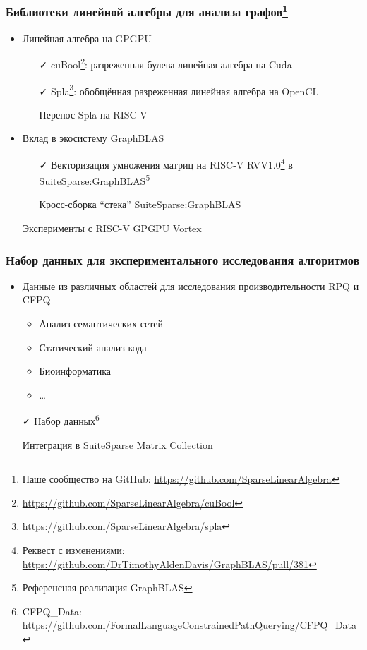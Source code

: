\documentclass[xcolor=table,aspectratio=169]{beamer}
\begin{document}
\begin{frame}[fragile]
  \frametitle{Библиотеки линейной алгебры для анализа графов\footnote{Наше сообщество на GitHub: \url{https://github.com/SparseLinearAlgebra}}}
  \begin{itemize}
    \item Линейная алгебра на GPGPU
    \begin{itemize}
      \item[\faCheck] cuBool\footnote{\url{https://github.com/SparseLinearAlgebra/cuBool}}: разреженная булева линейная алгебра на Cuda
      \item[\faCheck] Spla\footnote{\url{https://github.com/SparseLinearAlgebra/spla}}: обобщённая разреженная линейная алгебра на OpenCL
      \item[\faGears] Перенос Spla на RISC-V
    \end{itemize}
    \item Вклад в экосистему GraphBLAS
    \begin{itemize}
      \item[\faCheck] Векторизация умножения матриц на RISC-V RVV1.0\footnote{Реквест с изменениями: \url{https://github.com/DrTimothyAldenDavis/GraphBLAS/pull/381}} в SuiteSparse:GraphBLAS\footnote{Референсная реализация GraphBLAS}
      \item[\faGears] Кросс-сборка ``стека'' SuiteSparse:GraphBLAS
    \end{itemize}
    \item[\faGears] Эксперименты с RISC-V GPGPU Vortex
  \end{itemize}
\end{frame}

\begin{frame}[fragile]
  \frametitle{Набор данных для экспериментального исследования алгоритмов}
  \begin{itemize}
    \item Данные из различных областей для исследования производительности RPQ и CFPQ
    \begin{itemize}
      \item Анализ семантических сетей
      \item Статический анализ кода
      \item Биоинформатика
      \item \ldots
    \end{itemize}    
    \item[\faCheck] Набор данных\footnote{CFPQ\_Data: \url{https://github.com/FormalLanguageConstrainedPathQuerying/CFPQ_Data}}
    \item[\faGears] Интеграция в SuiteSparse Matrix  Collection 
  \end{itemize}
\end{frame}
\end{document}
